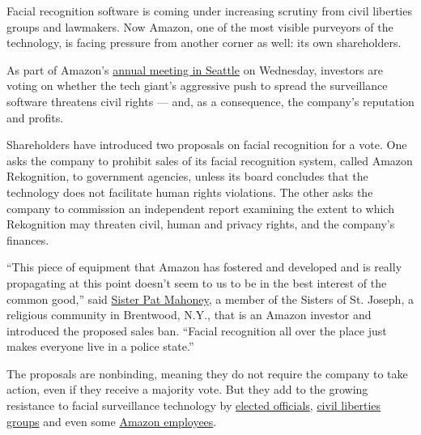 Facial recognition software is coming under increasing scrutiny from
civil liberties groups and lawmakers. Now Amazon, one of the most
visible purveyors of the technology, is facing pressure from another
corner as well: its own shareholders.

As part of Amazon's
\href{https://ir.aboutamazon.com/2019-annual-meeting-shareholders}{annual
meeting in Seattle} on Wednesday, investors are voting on whether the
tech giant's aggressive push to spread the surveillance software
threatens civil rights --- and, as a consequence, the company's
reputation and profits.

Shareholders have introduced two proposals on facial recognition for a
vote. One asks the company to prohibit sales of its facial recognition
system, called Amazon Rekognition, to government agencies, unless its
board concludes that the technology does not facilitate human rights
violations. The other asks the company to commission an independent
report examining the extent to which Rekognition may threaten civil,
human and privacy rights, and the company's finances.

``This piece of equipment that Amazon has fostered and developed and is
really propagating at this point doesn't seem to us to be in the best
interest of the common good,'' said
\href{https://brentwoodcsj.org/news/sister-pat-mahoney-leads-effort-to-end-bank-prison-financing/}{Sister
Pat Mahoney}, a member of the Sisters of St. Joseph, a religious
community in Brentwood, N.Y., that is an Amazon investor and introduced
the proposed sales ban. ``Facial recognition all over the place just
makes everyone live in a police state.''

The proposals are nonbinding, meaning they do not require the company to
take action, even if they receive a majority vote. But they add to the
growing resistance to facial surveillance technology by
\href{https://cbc.house.gov/news/documentsingle.aspx?DocumentID=898}{elected
officials},
\href{https://www.aclu.org/letter-nationwide-coalition-amazon-ceo-jeff-bezos-regarding-rekognition}{civil
liberties groups} and even some
\href{https://medium.com/s/powertrip/im-an-amazon-employee-my-company-shouldn-t-sell-facial-recognition-tech-to-police-36b5fde934ac}{Amazon
employees}.

